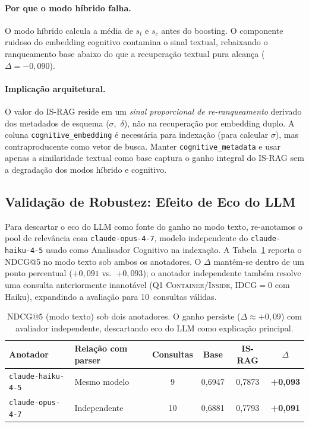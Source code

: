 \documentclass[11pt,a4paper]{article}
\begin{document}
\paragraph{Por que o modo híbrido falha.}
O modo híbrido calcula a média de $s_t$ e $s_c$ antes do boosting.
O componente ruidoso do embedding cognitivo contamina o sinal textual,
rebaixando o ranqueamento base abaixo do que a recuperação textual pura
alcança ($\Delta = -0{,}090$).

\paragraph{Implicação arquitetural.}
O valor do IS-RAG reside em um \emph{sinal proporcional de
re-ranqueamento} derivado dos metadados de esquema ($\sigma$,~$\delta$),
não na recuperação por embedding duplo.
A coluna \texttt{cognitive\_embedding} é necessária para indexação
(para calcular $\sigma$), mas contraproducente como vetor de busca.
Manter \texttt{cognitive\_metadata} e usar apenas a similaridade textual
como base captura o ganho integral do IS-RAG sem a degradação dos modos
híbrido e cognitivo.

\subsection{Validação de Robustez: Efeito de Eco do LLM}
\label{sec:robustness}

Para descartar o eco do LLM como fonte do ganho no modo texto,
re-anotamos o pool de relevância com \texttt{claude-opus-4-7}, modelo
independente do \texttt{claude-haiku-4-5} usado como Analisador Cognitivo
na indexação.
A Tabela~\ref{tab:annotator} reporta o NDCG@5 no modo texto sob ambos
os anotadores.
O $\Delta$ mantém-se dentro de um ponto percentual ($+0{,}091$
vs.\ $+0{,}093$); o anotador independente também resolve uma consulta
anteriormente inanotável (Q1 \textsc{Container}/\textsc{Inside},
IDCG${=}0$ com Haiku), expandindo a avaliação para 10~consultas válidas.

\begin{table}[H]
\centering
\small
\setlength{\tabcolsep}{5pt}
\begin{tabular}{llcccc}
\toprule
\textbf{Anotador} & \textbf{Relação com parser} & \textbf{Consultas} & \textbf{Base} & \textbf{IS-RAG} & \textbf{$\Delta$} \\
\midrule
\texttt{claude-haiku-4-5} & Mesmo modelo &  9 & 0,6947 & 0,7873 & \textbf{+0,093} \\
\texttt{claude-opus-4-7}  & Independente & 10 & 0,6881 & 0,7793 & \textbf{+0,091} \\
\bottomrule
\end{tabular}
\caption{NDCG@5 (modo texto) sob dois anotadores.
  O ganho persiste ($\Delta \approx +0{,}09$) com avaliador
  independente, descartando eco do LLM como explicação principal.}
\label{tab:annotator}
\end{table}
\end{document}
